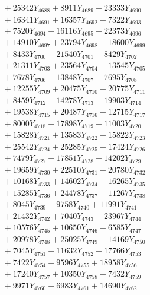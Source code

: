 \documentclass[a4paper,10pt]{article}
\begin{document}
{\begin{align}
&\;  + 25342 Y_{4688} + 8911 Y_{4689} + 23333 Y_{4690} \\[0.3ex]
&\;  + 16341 Y_{4691} + 16357 Y_{4692} + 7322 Y_{4693} \\[0.3ex]
&\;  + 7520 Y_{4694} + 16116 Y_{4695} + 22373 Y_{4696} \\[0.3ex]
&\;  + 14910 Y_{4697} + 23794 Y_{4698} + 18600 Y_{4699} \\[0.3ex]
&\;  + 8433 Y_{4700} + 21540 Y_{4701} + 8429 Y_{4702} \\[0.3ex]
&\;  + 21311 Y_{4703} + 23564 Y_{4704} + 13545 Y_{4705} \\[0.3ex]
&\;  + 7678 Y_{4706} + 13848 Y_{4707} + 7695 Y_{4708} \\[0.5ex]\allowbreak
&\;  + 12255 Y_{4709} + 20475 Y_{4710} + 20775 Y_{4711} \\[0.3ex]
&\;  + 8459 Y_{4712} + 14278 Y_{4713} + 19903 Y_{4714} \\[0.3ex]
&\;  + 19538 Y_{4715} + 20487 Y_{4716} + 12715 Y_{4717} \\[0.3ex]
&\;  + 8000 Y_{4718} + 17898 Y_{4719} + 11003 Y_{4720} \\[0.3ex]
&\;  + 15828 Y_{4721} + 13583 Y_{4722} + 15822 Y_{4723} \\[0.3ex]
&\;  + 25542 Y_{4724} + 25285 Y_{4725} + 17424 Y_{4726} \\[0.3ex]
&\;  + 7479 Y_{4727} + 17851 Y_{4728} + 14202 Y_{4729} \\[0.3ex]
&\;  + 19659 Y_{4730} + 22510 Y_{4731} + 20780 Y_{4732} \\[0.3ex]
&\;  + 10168 Y_{4733} + 14602 Y_{4734} + 16265 Y_{4735} \\[0.3ex]
&\;  + 15285 Y_{4736} + 24478 Y_{4737} + 11267 Y_{4738} \\[0.5ex]\allowbreak
&\;  + 8045 Y_{4739} + 9758 Y_{4740} + 11991 Y_{4741} \\[0.3ex]
&\;  + 21432 Y_{4742} + 7040 Y_{4743} + 23967 Y_{4744} \\[0.3ex]
&\;  + 10576 Y_{4745} + 10650 Y_{4746} + 6585 Y_{4747} \\[0.3ex]
&\;  + 20978 Y_{4748} + 25025 Y_{4749} + 14169 Y_{4750} \\[0.3ex]
&\;  + 7045 Y_{4751} + 11632 Y_{4752} + 17766 Y_{4753} \\[0.3ex]
&\;  + 7422 Y_{4754} + 9596 Y_{4755} + 18958 Y_{4756} \\[0.3ex]
&\;  + 17240 Y_{4757} + 10350 Y_{4758} + 7432 Y_{4759} \\[0.3ex]
&\;  + 9971 Y_{4760} + 6983 Y_{4761} + 14690 Y_{4762} \\[0.3ex]

\end{align}}
\end{document}
